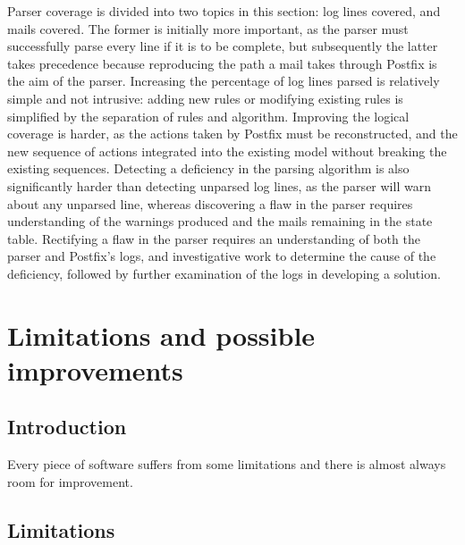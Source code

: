 \documentclass[a4paper,12pt,draft]{article}
\begin{document}
Parser coverage is divided into two topics in this section: log lines
covered, and mails covered.  The former is initially more important, as the
parser must successfully parse every line if it is to be complete, but
subsequently the latter takes precedence because reproducing the path a
mail takes through Postfix is the aim of the parser.  Increasing the
percentage of log lines parsed is relatively simple and not intrusive:
adding new rules or modifying existing rules is simplified by the
separation of rules and algorithm.  Improving the logical coverage is
harder, as the actions taken by Postfix must be reconstructed, and the new
sequence of actions integrated into the existing model without breaking
the existing sequences.  Detecting a deficiency in the parsing algorithm is
also significantly harder than detecting unparsed log lines, as the parser
will warn about any unparsed line, whereas discovering a flaw in the
parser requires understanding of the warnings produced and the mails
remaining in the state table.  Rectifying a flaw in the parser requires an
understanding of both the parser and Postfix's logs, and investigative work
to determine the cause of the deficiency, followed by further examination
of the logs in developing a solution.

\section{Limitations and possible improvements}

\label{limitations-improvements}

\subsection{Introduction}

Every piece of software suffers from some limitations and there is almost
always room for improvement.

\subsection{Limitations}
\end{document}
